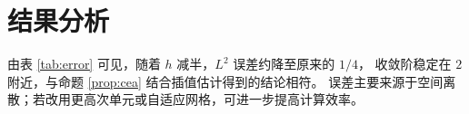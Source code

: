 \section{结果分析}

由表 \ref{tab:error} 可见，随着 $h$ 减半，$L^2$ 误差约降至原来的 $1/4$，
收敛阶稳定在 $2$ 附近，与命题 \ref{prop:cea} 结合插值估计得到的结论相符。
误差主要来源于空间离散；若改用更高次单元或自适应网格，可进一步提高计算效率。
